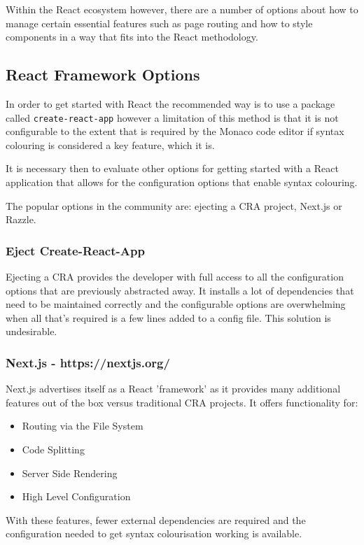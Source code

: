 Within the React ecosystem however, there are a number of options about how to manage certain essential features such as page routing and how to style components in a way that fits into the React methodology.

\subsection{React Framework Options}

In order to get started with React the recommended way is to use a package called \texttt{create-react-app} however a limitation of this method is that it is not configurable to the extent that is required by the Monaco code editor if syntax colouring is considered a key feature, which it is.

It is necessary then to evaluate other options for getting started with a React application that allows for the configuration options that enable syntax colouring.

The popular options in the community are: ejecting a CRA project, Next.js or Razzle.

\subsubsection{Eject Create-React-App}
Ejecting a CRA provides the developer with full access to all the configuration options that are previously abstracted away. It installs a lot of dependencies that need to be maintained correctly and the configurable options are overwhelming when all that's required is a few lines added to a config file. This solution is undesirable.

\subsubsection{Next.js - https://nextjs.org/}
Next.js advertises itself as a React 'framework' as it provides many additional features out of the box versus traditional CRA projects. It offers functionality for:

\begin{itemize}
  \item Routing via the File System
  \item Code Splitting
  \item Server Side Rendering
  \item High Level Configuration
\end{itemize}

With these features, fewer external dependencies are required and the configuration needed to get syntax colourisation working is available.

